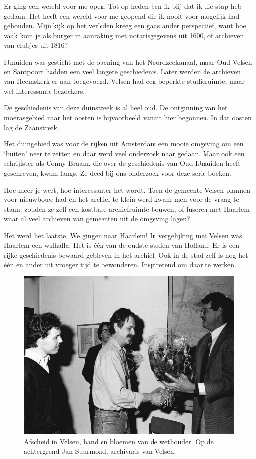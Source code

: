 \documentclass[10pt,twoside, openright]{memoir}
\begin{document}
Er ging een wereld voor me open. Tot op heden ben ik blij dat ik die stap heb gedaan. Het heeft een wereld voor me geopend die ik nooit voor mogelijk had gehouden. Mijn kijk op het verleden kreeg een gans ander perspectief, want hoe vaak kom je als burger in aanraking met notarisgegevens uit 1600, of archieven van clubjes uit 1816?

IJmuiden was gesticht met de opening van het Noordzeekanaal, maar Oud-Velsen en Santpoort hadden een veel langere geschiedenis. Later werden de archieven van Heemskerk er aan toegevoegd. Velsen had een beperkte studieruimte, maar wel interessante bezoekers. 

De geschiedenis van deze duinstreek is al heel oud. De ontginning van het moerasgebied naar het oosten is bijvoorbeeld vanuit hier begonnen. In dat oosten lag de Zaanstreek. 

Het duingebied was voor de rijken uit Amsterdam een mooie omgeving om een `buiten' neer te zetten en daar werd veel onderzoek naar gedaan. Maar ook een schrijfster als Conny Braam, die over de geschiedenis van Oud IJmuiden heeft geschreven, kwam langs. Ze deed bij ons onderzoek voor deze serie boeken.

Hoe meer je weet, hoe interessanter het wordt. Toen de gemeente Velsen plannen voor nieuwbouw had en het archief te klein werd kwam men voor de vraag te staan: zouden ze zelf een kostbare archiefruimte bouwen, of fuseren met Haarlem waar al veel archieven van gemeenten uit de omgeving lagen? 

Het werd het laatste. We gingen naar Haarlem! In vergelijking met Velsen was Haarlem een walhalla. Het is één van de oudste steden van Holland. Er is een rijke geschiedenis bewaard gebleven in het archief. Ook in de stad zelf is nog het één en ander uit vroeger tijd te bewonderen. Inspirerend om daar te werken. 

\begin{figure}
\includegraphics[width=\textwidth]{img/ch47/afscheid}
\caption*{\footnotesize Afscheid in Velsen, hand en bloemen van de wethouder. Op de achtergrond Jan Suurmond, archivaris van Velsen.}
\end{figure}
\end{document}
